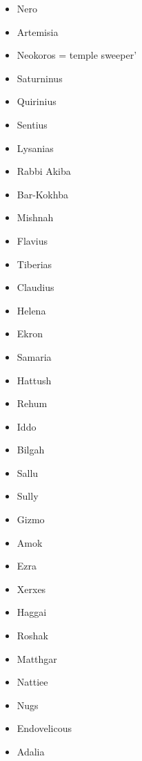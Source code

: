 \begin{multicols}{4}
	\begin{itemize}
		\item Nero
		\item Artemisia
		\item Neokoros = temple sweeper'
		\item Saturninus
		\item Quirinius
		\item Sentius
		\item Lysanias
		\item Rabbi Akiba
		\item Bar-Kokhba
		\item Mishnah
		\item Flavius
		\item Tiberias
		\item Claudius
		\item Helena
		\item Ekron
		\item Samaria
		\item Hattush
		\item Rehum
		\item Iddo
		\item Bilgah
		\item Sallu
		\item Sully
		\item Gizmo
		\item Amok
		\item Ezra
		\item Xerxes
		\item Haggai
		\item Roshak
		\item Matthgar
		\item Nattiee
		\item Nugs
		\item Endovelicous
		\item Adalia
	\end{itemize}
\end{multicols}